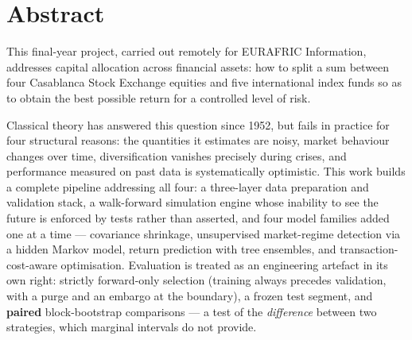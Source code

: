 \chapter*{Abstract}

This final-year project, carried out remotely for EURAFRIC Information, addresses capital
allocation across financial assets: how to split a sum between four Casablanca
Stock Exchange equities and five international index funds so as to obtain the
best possible return for a controlled level of risk.

Classical theory has answered this question since 1952, but fails in practice for
four structural reasons: the quantities it estimates are noisy, market behaviour
changes over time, diversification vanishes precisely during crises, and
performance measured on past data is systematically optimistic. This work builds
a complete pipeline addressing all four: a three-layer data preparation and
validation stack, a walk-forward simulation engine whose inability to see the
future is enforced by tests rather than asserted, and four model families added
one at a time — covariance shrinkage, unsupervised market-regime detection via a
hidden Markov model, return prediction with tree ensembles, and
transaction-cost-aware optimisation. Evaluation is treated as an engineering
artefact in its own right: strictly forward-only selection (training always
precedes validation, with a purge and an embargo at the boundary), a frozen test
segment, and \textbf{paired} block-bootstrap comparisons — a test of the
\emph{difference} between two strategies, which marginal intervals do not provide.


